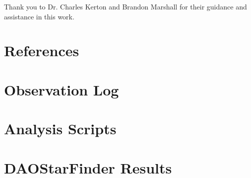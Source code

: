 \documentclass[%
aip,
jmp,
reprint,
floatfix,
nobibfootnote,
]{revtex4-1}
\begin{document}
	Thank you to Dr. Charles Kerton and Brandon Marshall for their guidance and assistance in this work.
	
	\section*{References}
	
%	
	
	
	
	\onecolumngrid
	\appendix
	
	\section{Observation Log}
	
	\begin{table}[H]
		\centering
		
		\label{table:log}
	\end{table}
	
	\section{Analysis Scripts}
	
	

	\section{DAOStarFinder Results}
	\begin{table}[H]
		\centering
		\caption{Table of the results from DAOStarFinder for each of the 10 photometric V \SI{0.1}{\second} exposures}
		
		\label{table:dao}
	\end{table}


	
\end{document}
